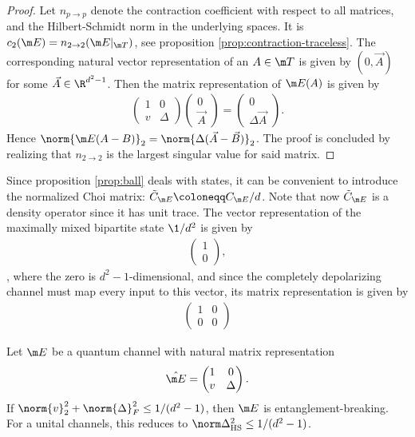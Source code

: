 \begin{proof} Let $n_{p\rightarrow p}$ denote the contraction coefficient with respect to all matrices, and the Hilbert-Schmidt norm in the underlying spaces. It is $c_2(\m E) = n_{2 \rightarrow 2}(\m E|_{\m T})$, see proposition \ref{prop:contraction-traceless}. The corresponding natural vector representation of an $A \in \m T$ is given by $(0,\vec A)$ for some $\vec A \in \R^{d^2-1}$. Then the matrix representation of $\m E(A)$ is given by
    \begin{align*}
        \begin{pmatrix}
         1 & 0\\
        v & \Delta
    \end{pmatrix}\begin{pmatrix}
        0 \\ \vec A
    \end{pmatrix} = 
    \begin{pmatrix}
        0\\ \Delta \vec A
    \end{pmatrix}.
    \end{align*}
    Hence $\norm{\m E(A-B)}_2 = \norm{\Delta(\vec A-\vec B)}_2$. The proof is concluded by realizing that $n_{2 \rightarrow 2}$ is the largest singular value for said matrix.
\end{proof}
Since proposition \ref{prop:ball} deals with states, it can be convenient to introduce the normalized Choi matrix: $\tilde C_{\m E} \coloneqq C_{\m E}/d$. Note that now $\tilde C_{\m E}$ is a density operator since it has unit trace. The vector representation of the maximally mixed bipartite state $\1/{d^2}$ is given by 
    \begin{align}
        \begin{pmatrix}
            1 \\ 0
        \end{pmatrix},
    \end{align}
    , where the zero is $d^2-1$-dimensional, and since the completely depolarizing channel must map every input to this vector, its matrix representation is given by 
    \begin{align}
    \begin{pmatrix}
        1 & 0\\
        0 & 0
    \end{pmatrix}
    \end{align}
\begin{prop}\label{prop:contraction}
    Let $\m E$ be a quantum channel with natural matrix representation 
    \begin{align*}
    \hat{\m E}= \begin{pmatrix}
         1 & 0\\
        v & \Delta
    \end{pmatrix}.
    \end{align*} If $\norm{v}_2^2 + \norm{\Delta}_F^2 \leq 1/(d^2-1)$, then $\m E$ is entanglement-breaking. For a unital channels, this reduces to $\norm \Delta_\text{HS}^2 \leq 1/(d^2-1)$.
\end{prop}
